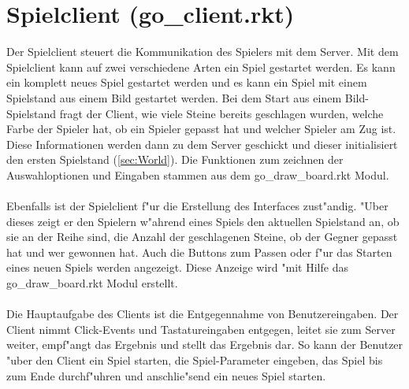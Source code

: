 \documentclass[a4paper]{scrreprt}
\begin{document}
\section{Spielclient (go\_client.rkt)}
Der Spielclient steuert die Kommunikation des Spielers mit dem Server. Mit dem Spielclient kann  auf zwei verschiedene Arten ein Spiel gestartet werden. Es kann ein komplett neues Spiel gestartet werden und es kann ein Spiel mit einem Spielstand aus einem Bild gestartet werden. Bei dem Start aus einem Bild-Spielstand fragt der Client, wie viele Steine bereits geschlagen wurden, welche Farbe der Spieler hat, ob ein Spieler gepasst hat und welcher Spieler am Zug ist. Diese Informationen werden dann zu dem Server geschickt und dieser initialisiert den ersten Spielstand (\ref{sec:World}). Die Funktionen zum zeichnen der Auswahloptionen und Eingaben stammen aus dem go\_draw\_board.rkt Modul.\\\\
Ebenfalls ist der Spielclient f"ur die Erstellung des Interfaces zust"andig. "Uber dieses zeigt er den Spielern w"ahrend eines Spiels den aktuellen Spielstand an, ob sie an der Reihe sind, die Anzahl der geschlagenen Steine, ob der Gegner gepasst hat und wer gewonnen hat. Auch die Buttons zum Passen oder f"ur das Starten eines neuen Spiels werden angezeigt. Diese Anzeige wird "mit Hilfe das  go\_draw\_board.rkt Modul erstellt.\\\\ 
Die Hauptaufgabe des Clients ist die Entgegennahme von Benutzereingaben. Der Client nimmt Click-Events und Tastatureingaben entgegen, leitet sie zum Server weiter, empf"angt das Ergebnis und stellt das Ergebnis dar. So kann der Benutzer "uber den Client ein Spiel starten, die Spiel-Parameter eingeben, das Spiel bis zum Ende durchf"uhren und anschlie"send ein neues Spiel starten.
\end{document}
